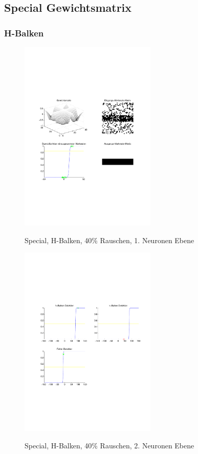\subsection{Special Gewichtsmatrix}
\subsubsection{H-Balken}
\begin{figure}[hbt]
	\begin{minipage}[c]{\textwidth}
		\centering
       	\includegraphics[trim=71 213 43 212, clip, width=0.58\textwidth]{./Bilder/Auswertung/Endergebnis/TypeSpecial_Rauschen40_H_Line_Layer1}
		\caption{Special, H-Balken, 40\% Rauschen, 1. Neuronen Ebene}
		\label{Special_H_40_1}
		\vfill
		\includegraphics[trim=71 213 43 212, clip, width=0.58\textwidth]{./Bilder/Auswertung/Endergebnis/TypeSpecial_Rauschen40_H_Line_Layer2}
		\caption{Special, H-Balken, 40\% Rauschen, 2. Neuronen Ebene}
		\label{Special_H_40_2}
	\end{minipage}
\end{figure}

